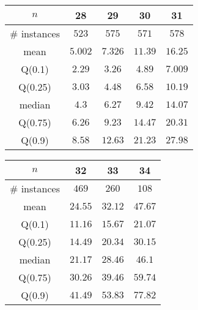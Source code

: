 \begin{tabular}{c|cccc} 
\hline 
$n$ & 28 & 29 & 30 & 31 \tabularnewline 
\hline 
\hline 
\# instances & $523$ & $575$ & $571$ & $578$ \tabularnewline 
mean & $5.002$ & $7.326$ & $11.39$ & $16.25$ \tabularnewline 
Q(0.1) & $2.29$ & $3.26$ & $4.89$ & $7.009$ \tabularnewline 
Q(0.25) & $3.03$ & $4.48$ & $6.58$ & $10.19$ \tabularnewline 
median & $4.3$ & $6.27$ & $9.42$ & $14.07$ \tabularnewline 
Q(0.75) & $6.26$ & $9.23$ & $14.47$ & $20.31$ \tabularnewline 
Q(0.9) & $8.58$ & $12.63$ & $21.23$ & $27.98$ \tabularnewline 
\hline 
\end{tabular} 
\medskip{} 

\begin{tabular}{c|ccc} 
\hline 
$n$ & 32 & 33 & 34 \tabularnewline 
\hline 
\hline 
\# instances & $469$ & $260$ & $108$ \tabularnewline 
mean & $24.55$ & $32.12$ & $47.67$ \tabularnewline 
Q(0.1) & $11.16$ & $15.67$ & $21.07$ \tabularnewline 
Q(0.25) & $14.49$ & $20.34$ & $30.15$ \tabularnewline 
median & $21.17$ & $28.46$ & $46.1$ \tabularnewline 
Q(0.75) & $30.26$ & $39.46$ & $59.74$ \tabularnewline 
Q(0.9) & $41.49$ & $53.83$ & $77.82$ \tabularnewline 
\hline 
\end{tabular} 
\medskip{} 

